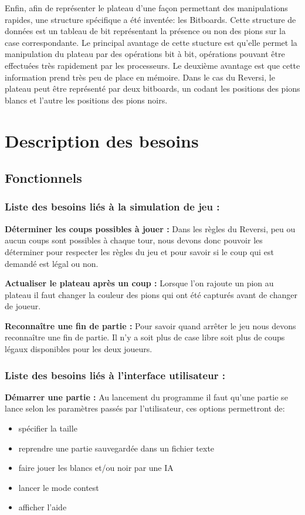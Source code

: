 \documentclass[12pt]{article}
\begin{document}
Enfin, afin de représenter le plateau d'une façon permettant des manipulations rapides, une structure spécifique a été inventée: les Bitboards\cite{bitboard}. Cette structure de données est un tableau de bit représentant la présence ou non des pions sur la case correspondante. Le principal avantage de cette stucture est qu'elle permet la manipulation du plateau par des opérations bit à bit, opérations pouvant être effectuées très rapidement par les processeurs. Le deuxième avantage est que cette information prend très peu de place en mémoire. Dans le cas du Reversi, le plateau peut être représenté par deux bitboards, un codant les positions des pions blancs et l'autre les positions des pions noirs.

\section{Description des besoins}
\subsection{Fonctionnels}

\subsubsection{Liste des besoins liés à la simulation de jeu :}

\textbf{Déterminer les coups possibles à jouer :}
Dans les règles du Reversi\cite{regle}, peu ou aucun coups sont possibles à chaque tour, nous devons donc pouvoir les déterminer pour respecter les règles du jeu et pour savoir si le coup qui est demandé est légal ou non.

\textbf{Actualiser le plateau après un coup :}
Lorsque l'on rajoute un pion au plateau il faut changer la couleur des pions qui ont été capturés avant de changer de joueur.

\textbf{Reconnaître une fin de partie : }
Pour savoir quand arrêter le jeu nous devons reconnaître une fin de partie. Il n'y a soit plus de case libre soit plus de coups légaux disponibles pour les deux joueurs.

\subsubsection{Liste des besoins liés à l'interface utilisateur :}

\textbf{Démarrer une partie :}
Au lancement du programme il faut qu'une partie se lance selon les paramètres passés par l'utilisateur, ces options permettront de:
\begin{itemize}
\item spécifier la taille
\item reprendre une partie sauvegardée dans un fichier texte
\item faire jouer les blancs et/ou noir par une IA
\item lancer le mode contest
\item afficher l'aide
\end{itemize}
\end{document}
